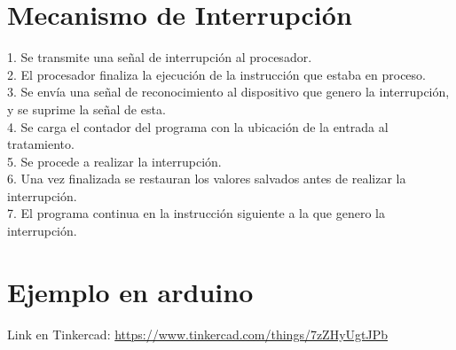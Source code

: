 \documentclass[11pt,letterpaper]{article}
\begin{document}


\section*{Mecanismo de Interrupción}
1.	Se transmite una señal de interrupción al procesador.\\
2.	El procesador finaliza la ejecución de la instrucción que estaba en proceso.\\
3.	Se envía una señal de reconocimiento al dispositivo que genero la interrupción, y se suprime la señal de esta.\\
4.	Se carga el contador del programa con la ubicación de la entrada al tratamiento.\\
5.	Se procede a realizar la interrupción.\\
6.	Una vez finalizada se restauran los valores salvados antes de realizar la interrupción.\\
7.	El programa continua en la instrucción siguiente a la que genero la interrupción.

\section*{Ejemplo en arduino}
Link en Tinkercad: \url{https://www.tinkercad.com/things/7zZHyUgtJPb}
\end{document}
